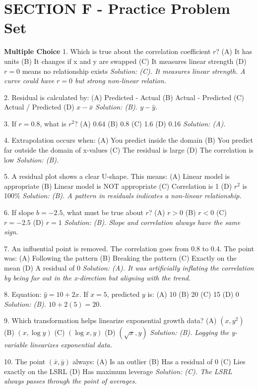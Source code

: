 \section{SECTION F - Practice Problem Set}
\begin{workbookbox}
\textbf{Multiple Choice}
1. Which is true about the correlation coefficient $r$?
(A) It has units (B) It changes if x and y are swapped (C) It measures linear strength (D) $r=0$ means no relationship exists
\textit{Solution: (C). It measures linear strength. A curve could have $r=0$ but strong non-linear relation.}

2. Residual is calculated by:
(A) Predicted - Actual (B) Actual - Predicted (C) Actual / Predicted (D) $x - \bar{x}$
\textit{Solution: (B). $y - \hat{y}$.}

3. If $r = 0.8$, what is $r^2$?
(A) 0.64 (B) 0.8 (C) 1.6 (D) 0.16
\textit{Solution: (A).}

4. Extrapolation occurs when:
(A) You predict inside the domain (B) You predict far outside the domain of x-values (C) The residual is large (D) The correlation is low
\textit{Solution: (B).}

5. A residual plot shows a clear U-shape. This means:
(A) Linear model is appropriate (B) Linear model is NOT appropriate (C) Correlation is 1 (D) $r^2$ is 100\%
\textit{Solution: (B). A pattern in residuals indicates a non-linear relationship.}

6. If slope $b = -2.5$, what must be true about $r$?
(A) $r > 0$ (B) $r < 0$ (C) $r = -2.5$ (D) $r = 1$
\textit{Solution: (B). Slope and correlation always have the same sign.}

7. An influential point is removed. The correlation goes from 0.8 to 0.4. The point was:
(A) Following the pattern (B) Breaking the pattern (C) Exactly on the mean (D) A residual of 0
\textit{Solution: (A). It was artificially inflating the correlation by being far out in the x-direction but aligning with the trend.}

8. Equation: $\hat{y} = 10 + 2x$. If $x=5$, predicted $y$ is:
(A) 10 (B) 20 (C) 15 (D) 0
\textit{Solution: (B). $10 + 2(5) = 20$.}

9. Which transformation helps linearize exponential growth data?
(A) $(x, y^2)$ (B) $(x, \log y)$ (C) $(\log x, y)$ (D) $(\sqrt{x}, y)$
\textit{Solution: (B). Logging the y-variable linearizes exponential data.}

10. The point $(\bar{x}, \bar{y})$ always:
(A) Is an outlier (B) Has a residual of 0 (C) Lies exactly on the LSRL (D) Has maximum leverage
\textit{Solution: (C). The LSRL always passes through the point of averages.}


\end{workbookbox}
